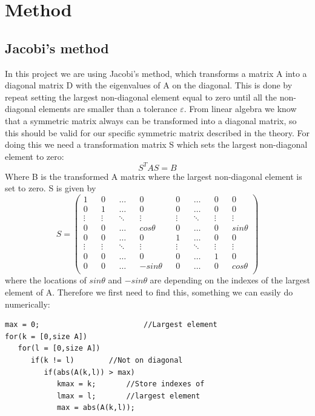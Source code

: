 \documentclass[norsk,a4paper,12pt]{article}
\begin{document}
\section{Method}
\subsection{Jacobi's method}
In this project we are using Jacobi's method, which transforms a matrix A into a diagonal matrix D with the eigenvalues of A on the diagonal. This is done by repeat setting the largest non-diagonal element equal to zero until all the non-diagonal elements are smaller than a tolerance $\varepsilon$. From linear algebra we know that a symmetric matrix always can be transformed into a diagonal matrix, so this should be valid for our specific symmetric matrix described in the theory. For doing this we need a transformation matrix S which sets the largest non-diagonal element to zero:
\begin{equation}
S^T A S=B
\end{equation}
Where B is the transformed A matrix where the largest non-diagonal element is set to zero. S is given by
\setcounter{MaxMatrixCols}{20}
\begin{equation}
S=\begin{pmatrix} 
1	&&0	&&\hdots		&&0		&&0	&&\hdots	&&0 	&&0\\
0	&&1		&&\hdots&&0&&0&&\hdots&&0&&0\\ \vdots&&\vdots&&\ddots&&\vdots&&\vdots&&\ddots&&\vdots&&\vdots\\ 0&&0&&\hdots&&cos\theta&&0&&\hdots&&0&&sin\theta\\
0&&0&&\hdots&&0&&1&&\hdots&&0&&0\\ \vdots&&\vdots&&\ddots&&\vdots&&\vdots&&\ddots&&\vdots&&\vdots\\ 0&&0&&\hdots&&0&&0&&\hdots&&1&&0\\
0&&0&&\hdots&&-sin\theta&&0&&\hdots&&0&&cos\theta\\
\end{pmatrix}
\end{equation}
where the locations of $sin\theta$ and $-sin\theta$ are depending on the indexes of the largest element of A. Therefore we first need to find this, something we can easily do numerically:
\begin{lstlisting}
max = 0;                     	//Largest element
for(k = [0,size A])
   for(l = [0,size A])
      if(k != l)		//Not on diagonal
         if(abs(A(k,l)) > max)
            kmax = k;		//Store indexes of
            lmax = l;		//largest element
            max = abs(A(k,l));
\end{lstlisting}
\end{document}
